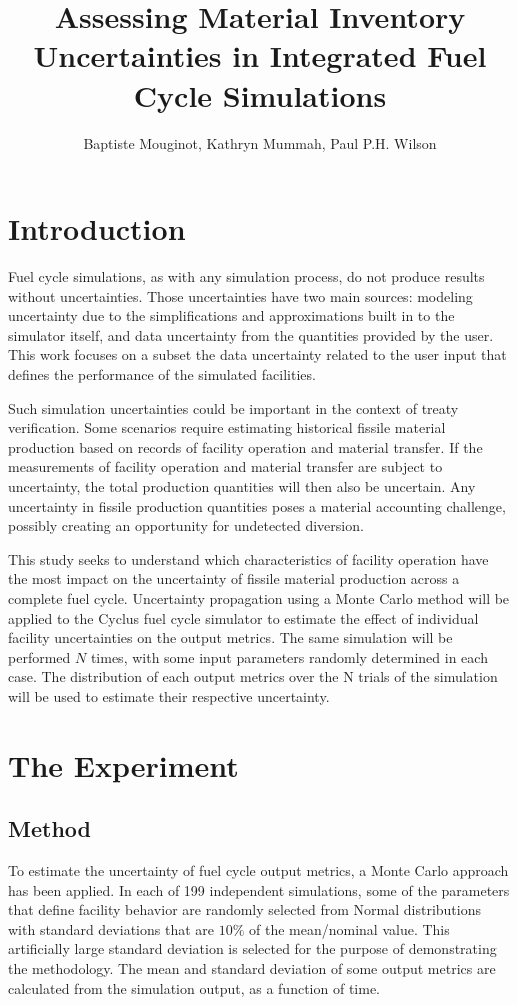 \documentclass{anstrans}
\title{Assessing Material Inventory Uncertainties in Integrated Fuel Cycle Simulations}
\author{Baptiste Mouginot, Kathryn Mummah, Paul P.H.  Wilson}
\institute{
University of Wisconsin-Madison, Madison, WI
}
\begin{document}
\section{Introduction}

Fuel cycle simulations, as with any simulation process, do not produce results
without uncertainties.  Those uncertainties have two main sources: modeling
uncertainty due to the simplifications and approximations built in to the
simulator itself, and data uncertainty from the quantities provided by the
user. This work focuses on a subset the data uncertainty related to
the user input that defines the performance of the simulated facilities.

Such simulation uncertainties could be important in the context of treaty
verification.  Some scenarios require estimating historical fissile material
production based on records of facility operation and material transfer.  If
the measurements of facility operation and material transfer are subject to
uncertainty, the total production quantities will then also be uncertain.  Any
uncertainty in fissile production quantities poses a material accounting
challenge, possibly creating an opportunity for undetected diversion.

This study seeks to understand which characteristics of facility operation have the
most impact on the uncertainty of fissile material production across a complete
fuel cycle.  Uncertainty propagation using a Monte Carlo method will be applied
to the Cyclus fuel cycle simulator \cite{cyclus} to estimate the effect of
individual facility uncertainties on the output metrics. The same simulation
will be performed $N$ times, with some input parameters randomly determined in each case.
The distribution of each output metrics over the N trials of the simulation
will be used to estimate their
respective uncertainty.

\section{The Experiment}

\subsection{Method}

To estimate the uncertainty of fuel cycle output metrics, a Monte
Carlo approach has been applied.  In each of 199 independent simulations,
some of the parameters that define facility behavior are randomly selected
from Normal distributions with standard deviations that are $10\%$ of the mean/nominal
value.  This artificially large standard deviation is selected for the purpose
of demonstrating the methodology.  The mean and standard deviation of some
output metrics are calculated from the simulation output, as a function of time.
\end{document}
